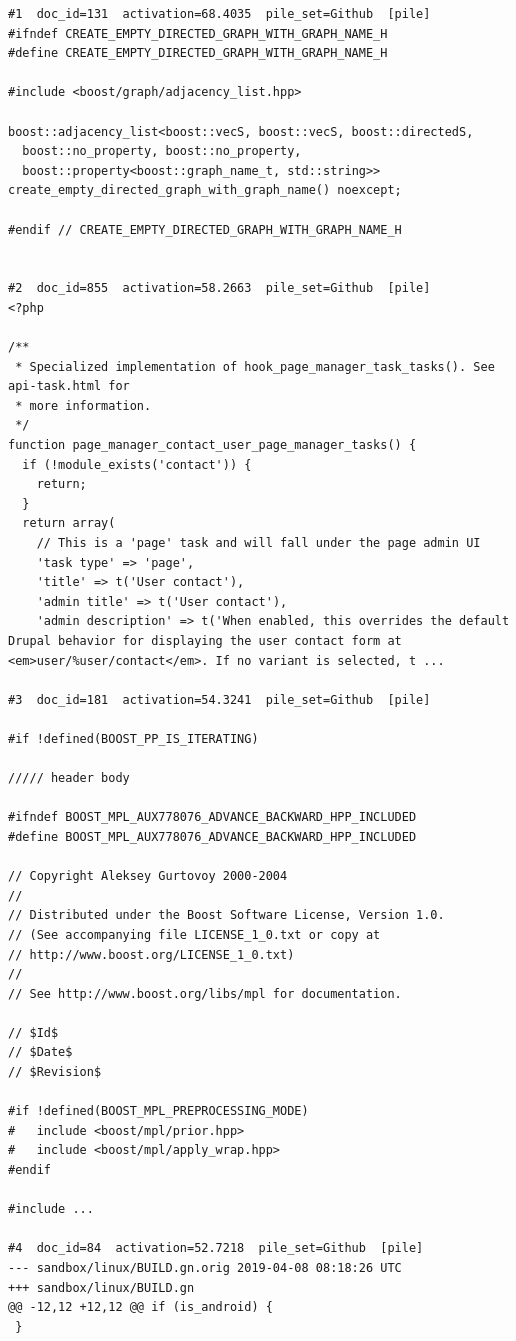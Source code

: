 \begin{verbatim}
#1  doc_id=131  activation=68.4035  pile_set=Github  [pile]
#ifndef CREATE_EMPTY_DIRECTED_GRAPH_WITH_GRAPH_NAME_H
#define CREATE_EMPTY_DIRECTED_GRAPH_WITH_GRAPH_NAME_H

#include <boost/graph/adjacency_list.hpp>

boost::adjacency_list<boost::vecS, boost::vecS, boost::directedS,
  boost::no_property, boost::no_property,
  boost::property<boost::graph_name_t, std::string>>
create_empty_directed_graph_with_graph_name() noexcept;

#endif // CREATE_EMPTY_DIRECTED_GRAPH_WITH_GRAPH_NAME_H


#2  doc_id=855  activation=58.2663  pile_set=Github  [pile]
<?php

/**
 * Specialized implementation of hook_page_manager_task_tasks(). See api-task.html for
 * more information.
 */
function page_manager_contact_user_page_manager_tasks() {
  if (!module_exists('contact')) {
    return;
  }
  return array(
    // This is a 'page' task and will fall under the page admin UI
    'task type' => 'page',
    'title' => t('User contact'),
    'admin title' => t('User contact'),
    'admin description' => t('When enabled, this overrides the default Drupal behavior for displaying the user contact form at <em>user/%user/contact</em>. If no variant is selected, t ...

#3  doc_id=181  activation=54.3241  pile_set=Github  [pile]

#if !defined(BOOST_PP_IS_ITERATING)

///// header body

#ifndef BOOST_MPL_AUX778076_ADVANCE_BACKWARD_HPP_INCLUDED
#define BOOST_MPL_AUX778076_ADVANCE_BACKWARD_HPP_INCLUDED

// Copyright Aleksey Gurtovoy 2000-2004
//
// Distributed under the Boost Software License, Version 1.0. 
// (See accompanying file LICENSE_1_0.txt or copy at 
// http://www.boost.org/LICENSE_1_0.txt)
//
// See http://www.boost.org/libs/mpl for documentation.

// $Id$
// $Date$
// $Revision$

#if !defined(BOOST_MPL_PREPROCESSING_MODE)
#   include <boost/mpl/prior.hpp>
#   include <boost/mpl/apply_wrap.hpp>
#endif

#include ...

#4  doc_id=84  activation=52.7218  pile_set=Github  [pile]
--- sandbox/linux/BUILD.gn.orig	2019-04-08 08:18:26 UTC
+++ sandbox/linux/BUILD.gn
@@ -12,12 +12,12 @@ if (is_android) {
 }
 

\end{verbatim}
